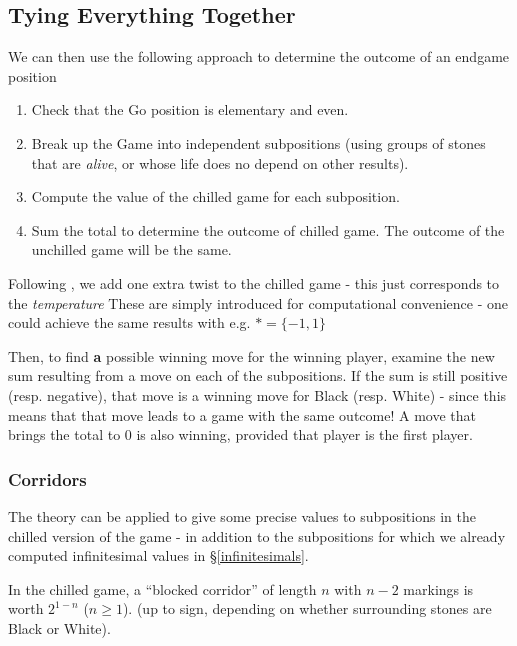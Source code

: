 \documentclass[../math194_paper.tex]{subfiles}
\begin{document}
\subsection{Tying Everything Together}

We can then use the following approach to determine the outcome of an endgame position
\begin{enumerate}
    \item Check that the Go position is elementary and even.
    \item Break up the Game into independent subpositions 
    (using groups of stones that are \textit{alive}, or whose life 
    does no depend on other results).
    \item Compute the value of the chilled game for each subposition.
    \item Sum the total to determine the outcome of chilled game. The outcome 
    of the unchilled game will be the same.
\end{enumerate}
Following \cite{berlekamp1994mathematical}, we add one extra twist to the chilled game
- this just corresponds to the \textit{temperature}
These are simply introduced for computational convenience - one could achieve the same 
results with e.g. $* = \{-1,1\}$

Then, to find \textbf{a} possible winning move for the winning player, examine 
the new sum resulting from a move on each of the subpositions. If the sum is 
still positive (resp. negative), that move is a winning move for Black 
(resp. White) - since this means that that move leads to a game with the same outcome!
A move that brings the total to 0 is also winning, provided that 
player is the first player. 

\subsubsection{Corridors}
The theory can be applied to give some precise values to subpositions in the chilled version of the game - 
in addition to the subpositions for which we already computed infinitesimal values in \S \ref{infinitesimals}.
\begin{theorem}
    \label{blocked_corridor}
    In the chilled game, a ``blocked corridor'' of length $n$ with $n-2$ markings is worth $2^{1-n}$ ($n\geq1$).
    (up to sign, depending on whether surrounding stones are Black or White).
\end{theorem}
\end{document}
